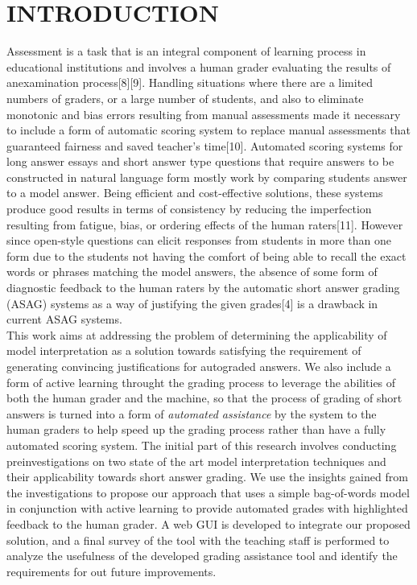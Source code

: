 \documentclass[letterpaper, 10 pt, conference]{ieeeconf}  %
\begin{document}
\section{INTRODUCTION}
Assessment is a task that is an integral component of learning process in educational institutions and involves a human grader evaluating the results of anexamination process[8][9]. Handling situations where there are a limited numbers of graders, or a large number of students, and also to eliminate monotonic and bias errors resulting from manual assessments made it necessary to include a form of automatic scoring system to replace manual assessments that guaranteed fairness and saved teacher’s time[10]. Automated scoring systems for long answer essays and short answer type questions that require answers to be constructed in natural language form mostly work by comparing students answer to a model answer. Being efficient and cost-effective solutions, these systems produce good results in terms of consistency by reducing the imperfection resulting from fatigue, bias, or ordering effects of the human raters[11]. However since open-style questions can elicit responses from students in more than one form due to the students not having the comfort of being able to recall the exact words or phrases matching the model answers, the absence of some form of diagnostic feedback to the human raters by the automatic short answer grading (ASAG) systems as a way of justifying the given grades[4] is a drawback in current ASAG systems.\\[2mm]
This work aims at addressing the problem of determining the applicability of model interpretation as a solution towards satisfying the requirement of generating convincing justifications for autograded answers. We also include a form of active learning throught the grading process to leverage the abilities of both the human grader and the machine, so that the process of grading of short answers is turned into a form of \textit{automated assistance} by the system to the human graders to help speed up the grading process rather than have a fully automated scoring system. The initial part of this research involves conducting preinvestigations on two state of the art model interpretation techniques and their applicability towards short answer grading. We use the insights gained from the investigations to propose our approach that uses a simple bag-of-words model in conjunction with active learning to provide automated grades with highlighted feedback to the human grader. A web GUI is developed to integrate our proposed solution, and a final survey of the tool with the teaching staff is performed to analyze the usefulness of the developed grading assistance tool and identify the requirements for out future improvements.
\end{document}

